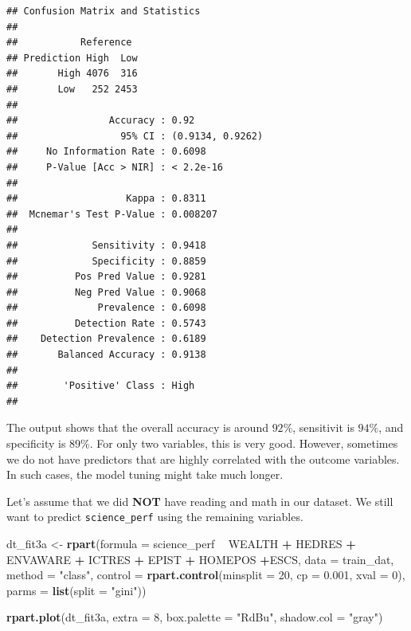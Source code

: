\documentclass[]{book}
\newenvironment{Shaded}{\begin{snugshade}}{\end{snugshade}}
\newcommand{\DataTypeTok}[1]{\textcolor[rgb]{0.13,0.29,0.53}{#1}}
\newcommand{\DecValTok}[1]{\textcolor[rgb]{0.00,0.00,0.81}{#1}}
\newcommand{\FloatTok}[1]{\textcolor[rgb]{0.00,0.00,0.81}{#1}}
\newcommand{\KeywordTok}[1]{\textcolor[rgb]{0.13,0.29,0.53}{\textbf{#1}}}
\newcommand{\NormalTok}[1]{#1}
\newcommand{\OperatorTok}[1]{\textcolor[rgb]{0.81,0.36,0.00}{\textbf{#1}}}
\newcommand{\StringTok}[1]{\textcolor[rgb]{0.31,0.60,0.02}{#1}}
\begin{document}
\begin{verbatim}
## Confusion Matrix and Statistics
## 
##           Reference
## Prediction High  Low
##       High 4076  316
##       Low   252 2453
##                                           
##                Accuracy : 0.92            
##                  95% CI : (0.9134, 0.9262)
##     No Information Rate : 0.6098          
##     P-Value [Acc > NIR] : < 2.2e-16       
##                                           
##                   Kappa : 0.8311          
##  Mcnemar's Test P-Value : 0.008207        
##                                           
##             Sensitivity : 0.9418          
##             Specificity : 0.8859          
##          Pos Pred Value : 0.9281          
##          Neg Pred Value : 0.9068          
##              Prevalence : 0.6098          
##          Detection Rate : 0.5743          
##    Detection Prevalence : 0.6189          
##       Balanced Accuracy : 0.9138          
##                                           
##        'Positive' Class : High            
## 
\end{verbatim}

The output shows that the overall accuracy is around \(92\%\), sensitivit is \(94\%\), and specificity is \(89\%\). For only two variables, this is very good. However, sometimes we do not have predictors that are highly correlated with the outcome variables. In such cases, the model tuning might take much longer.

Let's assume that we did \textbf{NOT} have reading and math in our dataset. We still want to predict \texttt{science\_perf} using the remaining variables.

\begin{Shaded}
\begin{Highlighting}[]
\NormalTok{dt_fit3a <-}\StringTok{ }\KeywordTok{rpart}\NormalTok{(}\DataTypeTok{formula =}\NormalTok{ science_perf }\OperatorTok{~}\StringTok{ }\NormalTok{WEALTH }\OperatorTok{+}\StringTok{ }\NormalTok{HEDRES }\OperatorTok{+}\StringTok{ }\NormalTok{ENVAWARE }\OperatorTok{+}\StringTok{ }\NormalTok{ICTRES }\OperatorTok{+}\StringTok{ }\NormalTok{EPIST }\OperatorTok{+}\StringTok{ }
\StringTok{                   }\NormalTok{HOMEPOS }\OperatorTok{+}\NormalTok{ESCS,}
                 \DataTypeTok{data =}\NormalTok{ train_dat,}
                 \DataTypeTok{method =} \StringTok{"class"}\NormalTok{, }
                 \DataTypeTok{control =} \KeywordTok{rpart.control}\NormalTok{(}\DataTypeTok{minsplit =} \DecValTok{20}\NormalTok{, }
                                         \DataTypeTok{cp =} \FloatTok{0.001}\NormalTok{, }
                                         \DataTypeTok{xval =} \DecValTok{0}\NormalTok{),}
                \DataTypeTok{parms =} \KeywordTok{list}\NormalTok{(}\DataTypeTok{split =} \StringTok{"gini"}\NormalTok{))}

\KeywordTok{rpart.plot}\NormalTok{(dt_fit3a, }\DataTypeTok{extra =} \DecValTok{8}\NormalTok{, }\DataTypeTok{box.palette =} \StringTok{"RdBu"}\NormalTok{, }\DataTypeTok{shadow.col =} \StringTok{"gray"}\NormalTok{)}
\end{Highlighting}
\end{Shaded}
\end{document}

